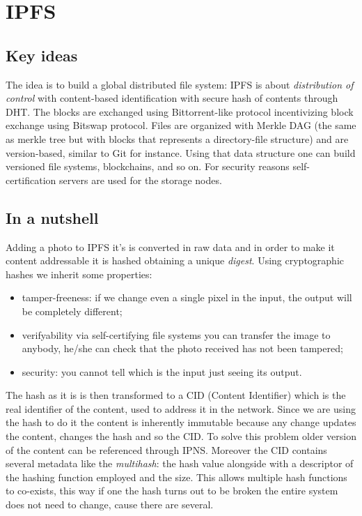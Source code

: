 \section{IPFS}
\subsection{Key ideas}
The idea is to build a global distributed file system: IPFS is about \emph{distribution of control} with content-based identification with secure hash of contents through DHT.
The blocks are exchanged using Bittorrent-like protocol incentivizing block exchange using Bitswap protocol.
Files are organized with Merkle DAG (the same as merkle tree but with blocks that represents a directory-file structure) and are version-based, similar to Git for instance.
Using that data structure one can build versioned file systems, blockchains, and so on.
For security reasons self-certification servers are used for the storage nodes.

\subsection{In a nutshell}
Adding a photo to IPFS it's is converted in raw data and in order to make it content addressable it is hashed obtaining a unique \emph{digest}.
Using cryptographic hashes we inherit some properties:
\begin{itemize}
    \item tamper-freeness: if we change even a single pixel in the input, the output will be completely different;
    \item verifyability via self-certifying file systems you can transfer the image to anybody, he/she can check that the photo received has not been tampered;
    \item security: you cannot tell which is the input just seeing its output.
\end{itemize}

The hash as it is is then transformed to a CID (Content Identifier) which is the real identifier of the content, used to address it in the network.
Since we are using the hash to do it the content is inherently immutable because any change updates the content, changes the hash and so the CID.
To solve this problem older version of the content can be referenced through IPNS.
Moreover the CID contains several metadata like the \emph{multihash}: the hash value alongside with a descriptor of the hashing function employed and the size.
This allows multiple hash functions to co-exists, this way if one the hash turns out to be broken the entire system does not need to change, cause there are several.

